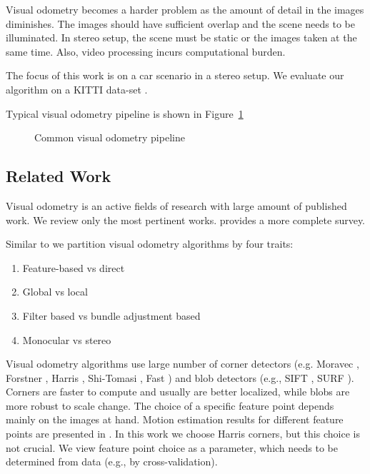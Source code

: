 \documentclass{bmvc2k}
\begin{document}
Visual odometry becomes a harder problem as the amount of detail in
the images diminishes. The images should have sufficient overlap and
the scene needs to be illuminated.  In stereo setup, the scene must be
static or the images taken at the same time. Also, video processing
incurs computational burden.

The focus of this work is on a car scenario in a stereo setup. We
evaluate our algorithm on a KITTI data-set \cite{Geiger2012}.

Typical visual odometry pipeline is shown in Figure~\ref{fig:pipeline}

\begin{figure}
  \begin{center}
    
  \end{center}
  \caption{Common visual odometry pipeline}
  \label{fig:pipeline}
\end{figure}

\subsection{Related Work}
Visual odometry is an active fields of research with large amount of
published work.  We review only the most pertinent works.
\cite{Scaramuzza2011} provides a more complete survey.

Similar to \cite{Persson2015} we partition visual odometry algorithms
by four traits:
\begin{enumerate}
\item Feature-based vs direct
\item Global vs local
\item Filter based vs bundle adjustment based
\item Monocular vs stereo
\end{enumerate}

Visual odometry algorithms use large number of corner detectors
(e.g. Moravec \cite{Moravec1980}, Forstner \cite{Forstner}, Harris
\cite{Harris1987}, Shi-Tomasi \cite{Shi1994}, Fast \cite{Rosten2006})
and blob detectors (e.g., SIFT \cite{Lowe2004}, SURF
\cite{Bay2006}). Corners are faster to compute and usually are better
localized, while blobs are more robust to scale change. The choice of
a specific feature point depends mainly on the images at hand.  Motion
estimation results for different feature points are presented in
\cite{Govender2009}. In this work we choose Harris \cite{Harris1987}
corners, but this choice is not crucial. We view feature point choice
as a parameter, which needs to be determined from data (e.g., by
cross-validation).
\end{document}
